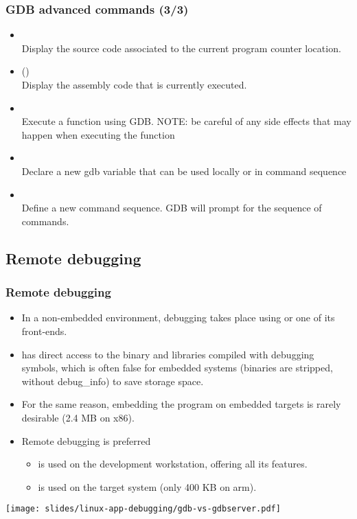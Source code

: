 \begin{frame}
  \frametitle{GDB advanced commands (3/3)}
  \small
  \begin{itemize}
    \item {}\\
      Display the source code associated to the current program counter location.
    \item {} ()\\
      Display the assembly code that is currently executed.
    \item {}\\
      Execute a function using GDB. NOTE: be careful of any side effects that
      may happen when executing the function
    \item {}\\
      Declare a new gdb variable that can be used locally or in command sequence
    \item {}\\
      Define a new command sequence. GDB will prompt for the sequence of
      commands.
  \end{itemize}
\end{frame}

\subsection{Remote debugging}

\begin{frame}
  \frametitle{Remote debugging}
  \begin{itemize}
  \item In a non-embedded environment, debugging takes place using 
    or one of its front-ends.
  \item {} has direct access to the binary and libraries compiled
    with debugging symbols, which is often false for embedded systems
    (binaries are stripped, without debug\_info) to save storage space.
  \item For the same reason, embedding the  program on embedded
    targets is rarely desirable (2.4 MB on x86).
  \item Remote debugging is preferred
    \begin{itemize}
    \item {} is used on the development workstation, offering
      all its features.
    \item {} is used on the target system (only 400 KB
      on arm).
    \end{itemize}
  \end{itemize}
  \begin{center}
    \texttt{[image: slides/linux-app-debugging/gdb-vs-gdbserver.pdf]}
  \end{center}
\end{frame}

